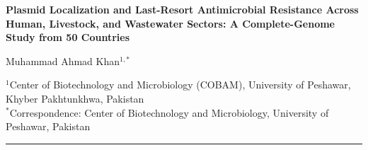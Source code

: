 \documentclass[11pt,a4paper]{article}
\begin{document}
\begin{center}
  {\LARGE\bfseries\color{primary} Plasmid Localization and Last-Resort Antimicrobial Resistance Across Human, Livestock, and Wastewater Sectors: A Complete-Genome Study from 50 Countries\par}
  \vspace{10pt}
  {\large Muhammad Ahmad Khan$^{1,*}$\par}
  \vspace{4pt}
  {\small\color{muted} $^{1}$Center of Biotechnology and Microbiology (COBAM), University of Peshawar, Khyber Pakhtunkhwa, Pakistan\\
  $^{*}$Correspondence: Center of Biotechnology and Microbiology, University of Peshawar, Pakistan\par}
\end{center}

\vspace{4pt}
\noindent\rule{\linewidth}{0.6pt}
\end{document}
